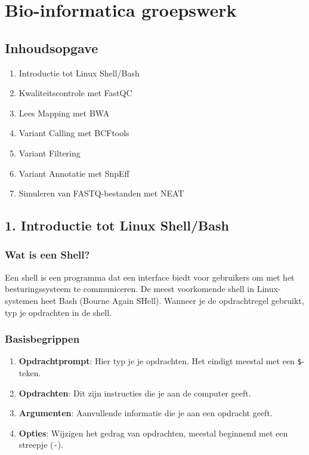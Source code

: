 \documentclass[
  letterpaper,
  DIV=11,
  numbers=noendperiod]{scrartcl}
\author{}
\date{}
\providecommand{\tightlist}{%
  \setlength{\itemsep}{0pt}\setlength{\parskip}{0pt}}\usepackage{longtable,booktabs,array}
\begin{document}
\section{Bio-informatica groepswerk}\label{bio-informatica-groepswerk}

\subsection{Inhoudsopgave}\label{inhoudsopgave}

\begin{enumerate}
\def\labelenumi{\arabic{enumi}.}
\tightlist
\item
  Introductie tot Linux Shell/Bash
\item
  Kwaliteitscontrole met FastQC
\item
  Lees Mapping met BWA
\item
  Variant Calling met BCFtools
\item
  Variant Filtering
\item
  Variant Annotatie met SnpEff
\item
  Simuleren van FASTQ-bestanden met NEAT
\end{enumerate}

\subsection{1. Introductie tot Linux
Shell/Bash}\label{introductie-tot-linux-shellbash}

\subsubsection{Wat is een Shell?}\label{wat-is-een-shell}

Een shell is een programma dat een interface biedt voor gebruikers om
met het besturingssysteem te communiceren. De meest voorkomende shell in
Linux-systemen heet Bash (Bourne Again SHell). Wanneer je de
opdrachtregel gebruikt, typ je opdrachten in de shell.

\subsubsection{Basisbegrippen}\label{basisbegrippen}

\begin{enumerate}
\def\labelenumi{\arabic{enumi}.}
\item
  \textbf{Opdrachtprompt}: Hier typ je je opdrachten. Het eindigt
  meestal met een \texttt{\$}-teken.
\item
  \textbf{Opdrachten}: Dit zijn instructies die je aan de computer
  geeft.
\item
  \textbf{Argumenten}: Aanvullende informatie die je aan een opdracht
  geeft.
\item
  \textbf{Opties}: Wijzigen het gedrag van opdrachten, meestal beginnend
  met een streepje (\texttt{-}).
\end{enumerate}
\end{document}
